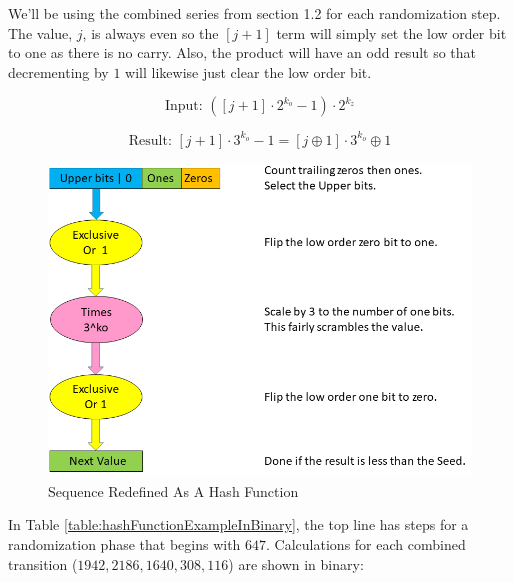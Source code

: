 \documentclass[preprint]{sigplanconf}
\begin{document}
We'll be using the combined series from section 1.2 for each randomization step. The value, $j$, is always even so the $[j + 1]$ term will simply set the low order bit to one as there is no carry. Also, the product will have an odd result so that decrementing by $1$ will likewise just clear the low order bit.


\[
    \text{Input: } ([j + 1] \cdot 2^{k_o} - 1) \cdot 2^{k_z}
\]

\[
    \text{Result: } [j + 1] \cdot 3^{k_o} - 1 = [j \oplus 1] \cdot 3^{k_o} \oplus 1
\]


\begin{figure} [ht]
    \begin{center}
        \includegraphics[width=\columnwidth]{collatz_even}
    \end{center}
    \caption{Sequence Redefined As A Hash Function}
    \label{figure:sequenceRedefined}
\end{figure}




In Table \ref{table:hashFunctionExampleInBinary}, the top line has steps for a randomization phase that begins with $647$. Calculations for each combined transition ($1942, 2186, 1640, 308, 116$) are shown in binary:
\end{document}
